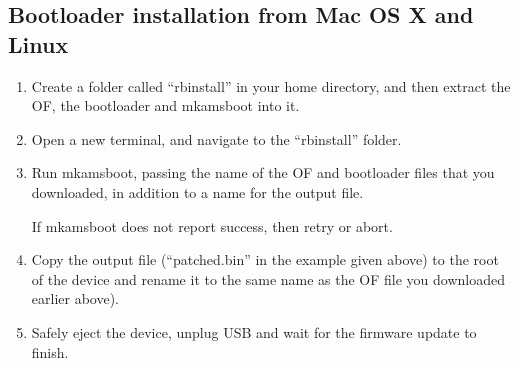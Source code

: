 \subsection{Bootloader installation from Mac OS X and Linux}

\begin{enumerate}

\item Create a folder called ``rbinstall'' in your home directory, and then
  extract the OF, the bootloader and mkamsboot into it.

\item Open a new terminal, and navigate to the ``rbinstall'' folder.

\item Run mkamsboot, passing the name of the OF and bootloader files that
  you downloaded, in addition to a name for the output file.

  \begin{code} 
  \end{code}
 
  If mkamsboot does not report success, then retry or abort.

\item Copy the output file (``patched.bin'' in the example given above) to the
  root of the device and rename it to the same name as the OF file you downloaded earlier 
   
   above).

\item Safely eject the device, unplug USB and wait for the firmware update to finish.
\end{enumerate}
